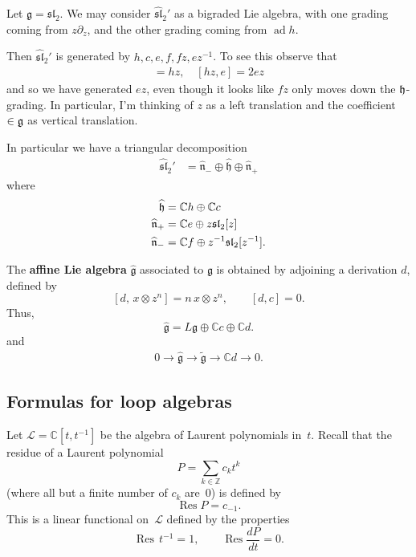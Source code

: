 \documentclass[12pt]{article}
\begin{document}
\begin{example}
    Let $\mathfrak{g} = \mathfrak{sl}_2$. We may consider $\widehat{\mathfrak{sl}}_2'$ as a bigraded Lie algebra, with one grading coming from $z\partial_z$, and the other grading coming from $\operatorname{ad} h$.

    Then $\widehat{\mathfrak{sl}}_2'$ is generated by $h, c, e, f, fz, ez^{-1}$. To see this observe that \begin{align*}
        [fz,e] = hz, \quad [hz,e] = 2ez
    \end{align*} and so we have generated $ez$, even though it looks like $fz$ only moves down the $\mathfrak{h}$-grading. In particular, I'm thinking of $z$ as a left translation and the coefficient $\in \mathfrak{g}$ as vertical translation.

    In particular we have a triangular decomposition \begin{align*}
        \widehat{\mathfrak{sl}}_2' & = \widehat{\mathfrak{n}}_- \oplus \widehat{\mathfrak{h}} \oplus \widehat{\mathfrak{n}}_+
    \end{align*} where \begin{align*}
        \widehat{\mathfrak{h}}          & = \mathbb{C}h \oplus \mathbb{C}c                    \\
        \widehat{\mathfrak{n}}_+ & = \mathbb{C}e \oplus z\mathfrak{sl}_2[z]            \\
        \widehat{\mathfrak{n}}_- & = \mathbb{C}f \oplus z^{-1}\mathfrak{sl}_2[z^{-1}].
    \end{align*}
\end{example}

\begin{definition}
    The \textbf{affine Lie algebra} $\widehat{\mathfrak{g}}$ associated to $\mathfrak{g}$ is obtained by adjoining a derivation $d$, defined by
    \[
        [d,\, x \otimes z^n] = n\,x \otimes z^n,
        \qquad [d,c]=0.
    \]
    Thus,
    \[
        \widehat{\mathfrak{g}} = L\mathfrak{g} \oplus \mathbb{C}c \oplus \mathbb{C}d.
    \] and \begin{align*}
        0 \to \widehat{\mathfrak{g}} \to \widetilde{\mathfrak{g}} \to \mathbb{C}d \to 0.
    \end{align*}
\end{definition}
\subsection{Formulas for loop algebras}
Let $\mathcal{L} = \mathbb{C}[t, t^{-1}]$ be the algebra of Laurent polynomials in~$t$.
Recall that the residue of a Laurent polynomial
\[
    P = \sum_{k \in \mathbb{Z}} c_k t^k
\]
(where all but a finite number of $c_k$ are~$0$) is defined by
\[
    \operatorname{Res} P = c_{-1}.
\]
This is a linear functional on~$\mathcal{L}$ defined by the properties
\[
    \operatorname{Res}\, t^{-1} = 1,
    \qquad
    \operatorname{Res} \frac{dP}{dt} = 0.
\]
\end{document}

